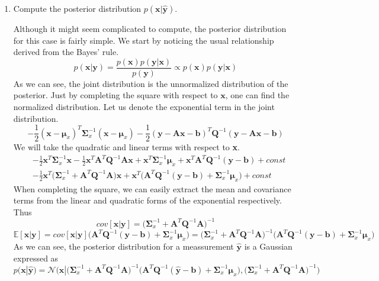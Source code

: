 \begin{enumerate}
\item Compute the posterior distribution $p(\textbf{x}|\hat{\textbf{y}})$.

Although it might seem complicated to compute, the posterior distribution for this case is fairly simple. We start by noticing the usual relationship derived from the Bayes' rule.
\[
p(\textbf{x}|\textbf{y}) = \frac{p(\textbf{x})p(\textbf{y}|\textbf{x})}{p(\textbf{y})} \propto p(\textbf{x})p(\textbf{y}|\textbf{x})
\]
As we can see, the joint distribution is the unnormalized distribution of the posterior. Just by completing the square with respect to $\textbf{x}$, one can find the normalized distribution. Let us denote the exponential term in the joint distribution.
\[
-\frac{1}{2}(\textbf{x} - \bm{\mu}_x)^T\bm{\Sigma}_x^{-1}(\textbf{x} - \bm{\mu}_x) -\frac{1}{2}(\textbf{y} - \textbf{A}\textbf{x} - \textbf{b})^T\textbf{Q}^{-1}(\textbf{y} - \textbf{A}\textbf{x} - \textbf{b})
\]
We will take the quadratic and linear terms with respect to \textbf{x}.
\begin{align*}
&-\frac{1}{2}\textbf{x}^T\bm{\Sigma}_x^{-1}\textbf{x} -\frac{1}{2}\textbf{x}^T\textbf{A}^T\textbf{Q}^{-1}\textbf{A}\textbf{x}
+ \textbf{x}^T\bm{\Sigma}_x^{-1}\bm{\mu}_x + \textbf{x}^T\textbf{A}^T\textbf{Q}^{-1}(\textbf{y} - \textbf{b}) + const\\
&-\frac{1}{2}\textbf{x}^T\Big(\bm{\Sigma}_x^{-1} + \textbf{A}^T\textbf{Q}^{-1}\textbf{A} \Big)\textbf{x} + \textbf{x}^T\Big( \textbf{A}^T\textbf{Q}^{-1}(\textbf{y} - \textbf{b}) + \bm{\Sigma}_x^{-1}\bm{\mu}_x \Big) + const
\end{align*}
When completing the square, we can easily extract the mean and covariance terms from the linear and quadratic forms of the exponential respectively. Thus
\[
cov[\textbf{x}|\textbf{y}] = \Big(\bm{\Sigma}_x^{-1} + \textbf{A}^T\textbf{Q}^{-1}\textbf{A} \Big)^{-1}
\]
\[
\mathbb{E}[\textbf{x}|\textbf{y}] = cov[\textbf{x}|\textbf{y}] \Big( \textbf{A}^T\textbf{Q}^{-1}(\textbf{y} - \textbf{b}) + \bm{\Sigma}_x^{-1}\bm{\mu}_x \Big) =  \Big(\bm{\Sigma}_x^{-1} + \textbf{A}^T\textbf{Q}^{-1}\textbf{A} \Big)^{-1}\Big( \textbf{A}^T\textbf{Q}^{-1}(\textbf{y} - \textbf{b}) + \bm{\Sigma}_x^{-1}\bm{\mu}_x \Big)
\]
As we can see, the posterior distribution for a meassurement $\hat{\textbf{y}}$ is a Gaussian expressed as
\[
p(\textbf{x}|\hat{\textbf{y}}) = \mathcal{N}\bigg(\textbf{x}| \Big(\bm{\Sigma}_x^{-1} + \textbf{A}^T\textbf{Q}^{-1}\textbf{A} \Big)^{-1}\Big( \textbf{A}^T\textbf{Q}^{-1}(\hat{\textbf{y}} - \textbf{b}) + \bm{\Sigma}_x^{-1}\bm{\mu}_x \Big), \Big(\bm{\Sigma}_x^{-1} + \textbf{A}^T\textbf{Q}^{-1}\textbf{A} \Big)^{-1}\bigg)
\]
\end{enumerate}